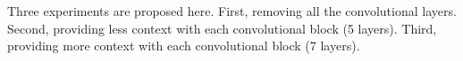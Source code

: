 
Three experiments are proposed here. First, removing all the
convolutional layers. Second, providing less context with each convolutional block (5 layers). Third, providing more context with each convolutional block (7 layers).

